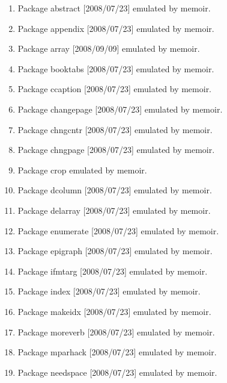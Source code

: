 \begin{enumerate}
\item 	Package abstract [2008/07/23] emulated by memoir.
\item 	Package appendix [2008/07/23] emulated by memoir.
\item 	Package array [2008/09/09] emulated by memoir.
\item 	Package booktabs [2008/07/23] emulated by memoir.
\item 	Package ccaption [2008/07/23] emulated by memoir.
\item 	Package changepage [2008/07/23] emulated by memoir.
\item 	Package chngcntr [2008/07/23] emulated by memoir.
\item 	Package chngpage [2008/07/23] emulated by memoir.
\item 	Package crop emulated by memoir.
\item 	Package dcolumn [2008/07/23] emulated by memoir.
\item 	Package delarray [2008/07/23] emulated by memoir.
\item 	Package enumerate [2008/07/23] emulated by memoir.
\item 	Package epigraph [2008/07/23] emulated by memoir.
\item 	Package ifmtarg [2008/07/23] emulated by memoir.
\item 	Package index [2008/07/23] emulated by memoir.
\item 	Package makeidx [2008/07/23] emulated by memoir.
\item 	Package moreverb [2008/07/23] emulated by memoir.
\item 	Package mparhack [2008/07/23] emulated by memoir.
\item 	Package needspace [2008/07/23] emulated by memoir.

\end{enumerate}

